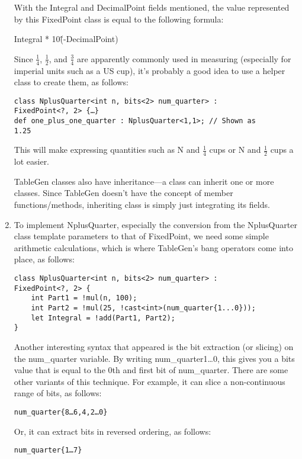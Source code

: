 \begin{enumerate}
With the Integral and DecimalPoint fields mentioned, the value represented by this FixedPoint class is equal to the following formula:

Integral * 10\^(-DecimalPoint)

Since $\frac{1}{4}$, $\frac{1}{2}$, and $\frac{3}{4}$ are apparently commonly used in measuring (especially for imperial units such as a US cup), it's probably a good idea to use a helper class to create them, as follows:

\begin{lstlisting}[style=styleCXX]
class NplusQuarter<int n, bits<2> num_quarter> :
FixedPoint<?, 2> {…}
def one_plus_one_quarter : NplusQuarter<1,1>; // Shown as
1.25
\end{lstlisting}

This will make expressing quantities such as N and $\frac{1}{4}$ cups or N and $\frac{1}{2}$ cups a lot easier.

TableGen classes also have inheritance—a class can inherit one or more classes. Since TableGen doesn't have the concept of member functions/methods, inheriting class is simply just integrating its fields.

\item To implement NplusQuarter, especially the conversion from the NplusQuarter class template parameters to that of FixedPoint, we need some simple arithmetic calculations, which is where TableGen's bang operators come into place, as follows:

\begin{lstlisting}[style=styleCXX]
class NplusQuarter<int n, bits<2> num_quarter> :
FixedPoint<?, 2> {
	int Part1 = !mul(n, 100);
	int Part2 = !mul(25, !cast<int>(num_quarter{1...0}));
	let Integral = !add(Part1, Part2);
}
\end{lstlisting}

Another interesting syntax that appeared is the bit extraction (or slicing) on the num\_quarter variable. By writing num\_quarter{1…0}, this gives you a bits value that is equal to the 0th and first bit of num\_quarter. There are some other variants of this technique. For example, it can slice a non-continuous range of bits, as follows:

\begin{lstlisting}[style=styleCXX]
num_quarter{8…6,4,2…0}
\end{lstlisting}

Or, it can extract bits in reversed ordering, as follows:

\begin{lstlisting}[style=styleCXX]
num_quarter{1…7}
\end{lstlisting}


\end{enumerate}
